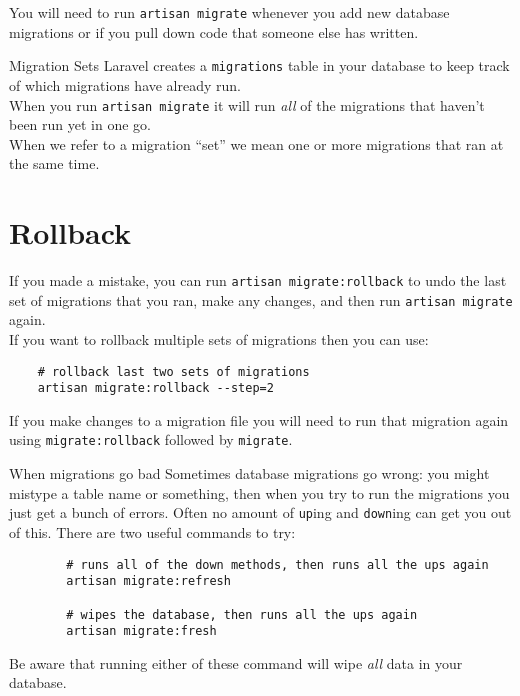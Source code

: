 You will need to run \texttt{artisan migrate} whenever you add new database migrations or if you pull down code that someone else has written.

\begin{infobox}{Migration Sets}
    Laravel creates a \texttt{migrations} table in your database to keep track of which migrations have already run.
    \\

    When you run \texttt{artisan migrate} it will run \textit{all} of the migrations that haven't been run yet in one go.
    \\

    When we refer to a migration ``set'' we mean one or more migrations that ran at the same time.
\end{infobox}


\section{Rollback}

If you made a mistake, you can run \texttt{artisan migrate:rollback} to undo the last set of migrations that you ran, make any changes, and then run \texttt{artisan migrate} again.
\\

If you want to rollback multiple sets of migrations then you can use:

\begin{verbatim}
    # rollback last two sets of migrations
    artisan migrate:rollback --step=2
\end{verbatim}

If you make changes to a migration file you will need to run that migration again using \texttt{migrate:rollback} followed by \texttt{migrate}.


\begin{infobox}{When migrations go bad}
    Sometimes database migrations go wrong: you might mistype a table name or something, then when you try to run the migrations you just get a bunch of errors. Often no amount of \texttt{up}ing and \texttt{down}ing can get you out of this. There are two useful commands to try:

    \begin{verbatim}
        # runs all of the down methods, then runs all the ups again
        artisan migrate:refresh

        # wipes the database, then runs all the ups again
        artisan migrate:fresh
    \end{verbatim}

    Be aware that running either of these command will wipe \textit{all} data in your database.
\end{infobox}



